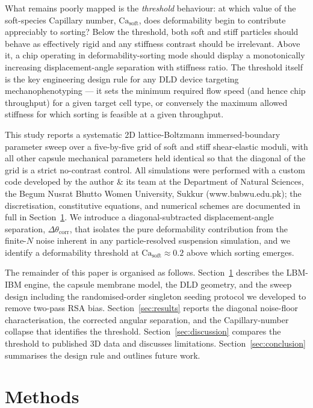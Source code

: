 \documentclass[11pt,a4paper]{article}
\begin{document}
What remains poorly mapped is the \emph{threshold} behaviour: at
which value of the soft-species Capillary number,
$\mathrm{Ca}_{\text{soft}}$, does deformability begin to contribute
appreciably to sorting? Below the threshold, both soft and stiff
particles should behave as effectively rigid and any stiffness
contrast should be irrelevant. Above it, a chip operating in
deformability-sorting mode should display a monotonically increasing
displacement-angle separation with stiffness ratio. The threshold
itself is the key engineering design rule for any DLD device
targeting mechanophenotyping --- it sets the minimum required flow
speed (and hence chip throughput) for a given target cell type, or
conversely the maximum allowed stiffness for which sorting is
feasible at a given throughput.

This study reports a systematic 2D lattice-Boltzmann
immersed-boundary parameter sweep over a five-by-five grid of soft
and stiff shear-elastic moduli, with all other capsule mechanical
parameters held identical so that the diagonal of the grid is a
strict no-contrast control. All simulations were performed with a
custom code developed by the author \& its team at the Department of Natural
Sciences, the Begum Nusrat Bhutto Women University, Sukkur (www.bnbwu.edu.pk); the discretisation, constitutive equations, and numerical schemes are documented in full in
Section~\ref{sec:methods}. We introduce a diagonal-subtracted
displacement-angle separation, $\Delta\theta_{\text{corr}}$, that isolates the pure deformability
contribution from the finite-$N$ noise inherent in any particle-resolved suspension simulation, and we identify a
deformability threshold at $\mathrm{Ca}_{\text{soft}} \approx 0.2$ above which sorting emerges.

The remainder of this paper is organised as follows.
Section~\ref{sec:methods} describes the LBM-IBM engine, the capsule
membrane model, the DLD geometry, and the sweep design including the
randomised-order singleton seeding protocol we developed to remove
two-pass RSA bias. Section~\ref{sec:results} reports the diagonal
noise-floor characterisation, the corrected angular separation, and
the Capillary-number collapse that identifies the threshold.
Section~\ref{sec:discussion} compares the threshold to published 3D
data and discusses limitations. Section~\ref{sec:conclusion}
summarises the design rule and outlines future work.

\section{Methods}
\label{sec:methods}
\end{document}

